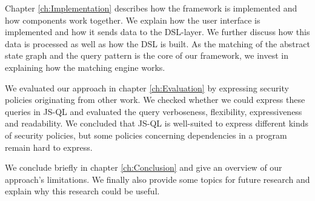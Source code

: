 Chapter \ref{ch:Implementation} describes how the framework is implemented and how components work together. We explain how the user interface is implemented and how it sends data to the DSL-layer. We further discuss how this data is processed as well as how the DSL is built. As the matching of the abstract state graph and the query pattern is the core of our framework, we invest in explaining how the matching engine works.

We evaluated our approach in chapter \ref{ch:Evaluation} by expressing security policies originating from other work. We checked whether we could express these queries in JS-QL and evaluated the query verboseness, flexibility, expressiveness and readability. We concluded that JS-QL is well-suited to express different kinds of security policies, but some policies concerning dependencies in a program remain hard to express. 

We conclude briefly in chapter \ref{ch:Conclusion} and give an overview of our approach's limitations. We finally also provide some topics for future research and explain why this research could be useful.